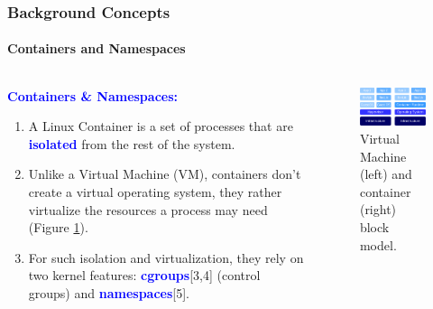 \documentclass[9pt,    %
    english,            %
    xcolor=table,       %
    envcountsect,        %
    aspectratio=169     %
]{beamer}
\begin{document}
\begin{frame}
    \frametitle{Background Concepts}
    \framesubtitle{Containers and Namespaces}

    \vspace{-25pt}

    \begin{columns}[t]
        \begin{column}{.55\textwidth}
            \textbf{\textcolor{blue}{Containers \& Namespaces:}}
            \begin{enumerate}
                \item A Linux Container is a set of processes that are \textbf{\textcolor{blue}{isolated}} from the rest of the system.
                \item Unlike a Virtual Machine (VM), containers don't create a virtual operating system, they rather virtualize the resources a process may need (Figure \ref{fig:differences}).
                \item For such isolation and virtualization, they rely on two kernel features: \textbf{\textcolor{blue}{cgroups}}[3,4] (control groups) and \textbf{\textcolor{blue}{namespaces}}[5].
            \end{enumerate}
        \end{column}
        \begin{column}{.35\textwidth}
            \begin{figure}[h!]
                \includegraphics[width=\textwidth]{./images/vm_vs_container.png}
                \caption{Virtual Machine (left) and container (right) block model.\label{fig:differences}}
            \end{figure}
        \end{column}
    \end{columns}
\end{frame}
\end{document}
